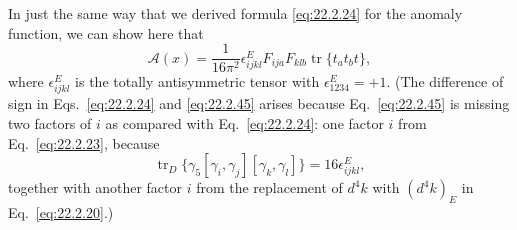 In just the same way that we derived formula \eqref{eq:22.2.24} for the
anomaly function, we can show here that
\begin{equation}
 \mathcal A(x)=\frac{1}{16\pi^2}\epsilon^E_{ijkl}
 F_{ija}F_{klb}\operatorname{tr}\{t_a t_b t\},
 \tag{22.2.45}\label{eq:22.2.45}
\end{equation}
where $\epsilon^E_{ijkl}$ is the totally antisymmetric tensor with
$\epsilon^E_{1234}=+1$. (The difference of sign in
Eqs.~\eqref{eq:22.2.24} and \eqref{eq:22.2.45} arises because
Eq.~\eqref{eq:22.2.45} is missing two factors of $i$ as compared with
Eq.~\eqref{eq:22.2.24}: one factor $i$ from Eq.~\eqref{eq:22.2.23},
because
\[
 \operatorname{tr}_{D}\{\gamma_5
 [\gamma_i,\gamma_j][\gamma_k,\gamma_l]\}
 =16\epsilon^E_{ijkl},
\]
together with another factor $i$ from the replacement of $d^4k$ with
$(d^4k)_E$ in Eq.~\eqref{eq:22.2.20}.)

